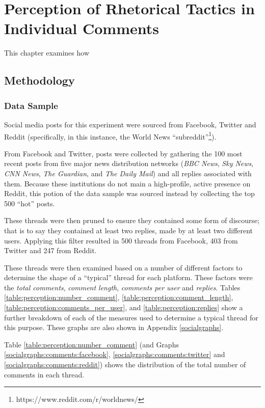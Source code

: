 \chapter{Perception of Rhetorical Tactics in Individual Comments}
\label{perception}

This chapter examines how


\section{Methodology}

\subsection{Data Sample}
\label{perception1:method:sample}
Social media posts for this experiment were sourced from Facebook, Twitter and Reddit (specifically, in this instance, the World News ``subreddit''\footnote{https://www.reddit.com/r/worldnews/}).

From Facebook and Twitter, posts were collected by gathering the 100 most recent posts from five major news distribution networks (\textit{BBC News}, \textit{Sky News}, \textit{CNN News}, \textit{The Guardian}, and \textit{The Daily Mail}) and all replies associated with them. Because these institutions do not main a high-profile, active presence on Reddit, this potion of the data sample was sourced instead by collecting the top 500 ``hot'' posts.

These threads were then pruned to ensure they contained some form of discourse; that is to say they contained at least two replies, made by at least two different users. Applying this filter resulted in 500 threads from Facebook, 403 from Twitter and 247 from Reddit.

These threads were then examined based on a number of different factors to determine the shape of a ``typical'' thread for each platform.
These factors were the \textit{total comments}, \textit{comment length}, \textit{comments per user} and \textit{replies}. \CITATION
Tables \ref{table:perception:number_comment}, \ref{table:perception:comment_length}, \ref{table:perception:comments_per_user}, and \ref{table:perception:replies} show a further breakdown of each of the measures used to determine a typical thread for this purpose. These graphs are also shown in Appendix \ref{socialgraphs}.

Table \ref{table:perception:number_comment} (and Graphs \ref{socialgraphs:comments:facebook}, \ref{socialgraphs:comments:twitter} and \ref{socialgraphs:comments:reddit}) shows the distribution of the total number of comments in each thread. 

